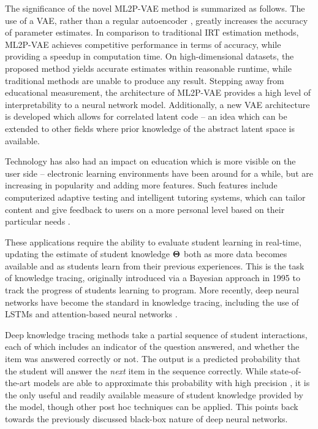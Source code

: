 The significance of the novel ML2P-VAE method is summarized as follows. The use of a VAE, rather than a regular autoencoder \cite{guo2017}, greatly increases the accuracy of parameter estimates. In comparison to traditional IRT estimation methods, ML2P-VAE achieves competitive performance in terms of accuracy, while providing a speedup in computation time. On high-dimensional datasets, the proposed method yields accurate estimates within reasonable runtime, while traditional methods are unable to produce any result. Stepping away from educational measurement, the architecture of ML2P-VAE provides a high level of interpretability to a neural network model. Additionally, a new VAE architecture is developed which allows for correlated latent code -- an idea which can be extended to other fields where prior knowledge of the abstract latent space is available.

Technology has also had an impact on education which is more visible on the user side -- electronic learning environments have been around for a while, but are increasing in popularity and adding more features. Such features include computerized adaptive testing and intelligent tutoring systems, which can tailor content and give feedback to users on a more personal level based on their particular needs \cite{meijer1999, ong2003}.

These applications require the ability to evaluate student learning in real-time, updating the estimate of student knowledge $\boldsymbol{\Theta}$ both as more data becomes available and as students learn from their previous experiences. This is the task of knowledge tracing, originally introduced via a Bayesian approach in 1995 \cite{corbett1995} to track the progress of students learning to program. More recently, deep neural networks have become the standard in knowledge tracing, including the use of LSTMs \cite{piech2015} and attention-based neural networks \cite{pandey2019}.

Deep knowledge tracing methods take a partial sequence of student interactions, each of which includes an indicator of the question answered, and whether the item was answered correctly or not. The output is a predicted probability that the student will answer the \textit{next} item in the sequence correctly. While state-of-the-art models are able to approximate this probability with high precision \cite{zhang2017}, it is the only useful and readily available measure of student knowledge provided by the model, though other post hoc techniques can be applied. This points back towards the previously discussed black-box nature of deep neural networks.

